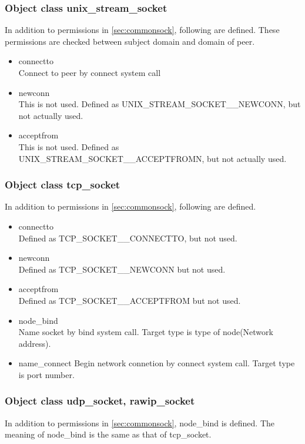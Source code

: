 \documentclass{article}
\begin{document}
\subsubsection{Object class  unix\_stream\_socket }
In addition to permissions in \ref{sec:commonsock}, following are
defined. These permissions are checked between subject domain and
domain of peer. 
\begin{itemize}
 \item  connectto\\
	Connect to peer by connect system call
 \item  newconn\\
	This is not used. Defined as UNIX\_STREAM\_SOCKET\_\_NEWCONN,
	but not actually used.
 \item acceptfrom\\
	This is not used. Defined as UNIX\_STREAM\_SOCKET\_\_ACCEPTFROMN,
	but not actually used.
\end{itemize}
    

\subsubsection{Object class  tcp\_socket }
In addition to permissions in \ref{sec:commonsock}, following are
defined. 
\begin{itemize}
 \item    connectto  \\
	  Defined as TCP\_SOCKET\_\_CONNECTTO, but not used.
 \item  newconn\\
	  Defined as TCP\_SOCKET\_\_NEWCONN but not used.
 \item  acceptfrom\\
	  Defined as TCP\_SOCKET\_\_ACCEPTFROM but not used.
	  
 \item  node\_bind \\ 
	  Name socket by bind system call. Target type is type of node(Network address).

 \item  name\_connect
	  Begin network connetion by connect system call. Target type is
	  port number.
\end{itemize}

\subsubsection{Object class udp\_socket, rawip\_socket }
In addition to permissions in \ref{sec:commonsock}, node\_bind is  defined.
The meaning of node\_bind is the same as that of tcp\_socket.
\end{document}
